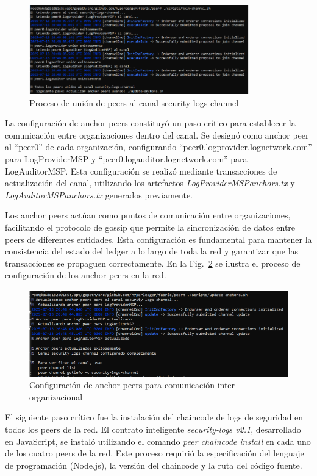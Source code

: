 \begin{figure}[H]
\centering
\includegraphics[width=0.85\textwidth]{figuras/unir_peers.png}
\caption{Proceso de unión de peers al canal security-logs-channel}
\label{fig:union-peers}
\end{figure}
La configuración de anchor peers constituyó un paso crítico para establecer la comunicación entre organizaciones dentro del canal. Se designó como anchor peer al “peer0” de cada organización, configurando “peer0.logprovider.lognetwork.com” para LogProviderMSP y “peer0.logauditor.lognetwork.com” para LogAuditorMSP. Esta configuración se realizó mediante transacciones de actualización del canal, utilizando los artefactos \textit{LogProviderMSPanchors.tx} y \textit{LogAuditorMSPanchors.tx} generados previamente.

Los anchor peers actúan como puntos de comunicación entre organizaciones, facilitando el protocolo de gossip que permite la sincronización de datos entre peers de diferentes entidades. Esta configuración es fundamental para mantener la consistencia del estado del ledger a lo largo de toda la red y garantizar que las transacciones se propaguen correctamente. En la Fig.~\ref{fig:anchor-peers} se ilustra el proceso de configuración de los anchor peers en la red.
\begin{figure}[H]
\centering
\includegraphics[width=1\textwidth]{figuras/configuracion_anchor_peers.png}
\caption{Configuración de anchor peers para comunicación inter-organizacional}
\label{fig:anchor-peers}
\end{figure}
El siguiente paso crítico fue la instalación del chaincode de logs de seguridad en todos los peers de la red. El contrato inteligente \textit{security-logs v2.1}, desarrollado en JavaScript, se instaló utilizando el comando \textit{peer chaincode install} en cada uno de los cuatro peers de la red. Este proceso requirió la especificación del lenguaje de programación (Node.js), la versión del chaincode y la ruta del código fuente.

